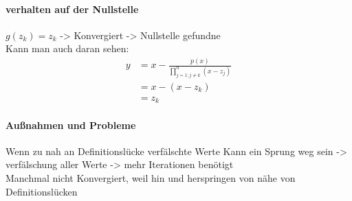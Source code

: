 \documentclass{article}
\begin{document}
\paragraph{verhalten auf der Nullstelle}
$g(z_k) = z_k$ -> Konvergiert -> Nullstelle gefundne
\\
Kann man auch daran sehen:
\begin{align*}
    y &= x - \frac{p(x)}{\prod_{j=1;j\neq k}^{n} (x-z_j)} \\
    &= x - (x-z_k) \\
    &= z_k
\end{align*}
\paragraph{Außnahmen und Probleme}
Wenn zu nah an Definitionslücke verfälschte Werte
Kann ein Sprung weg sein -> verfälschung aller Werte -> mehr Iterationen benötigt
\\
Manchmal nicht Konvergiert, weil hin und herspringen von nähe von Definitionslücken
\end{document}
